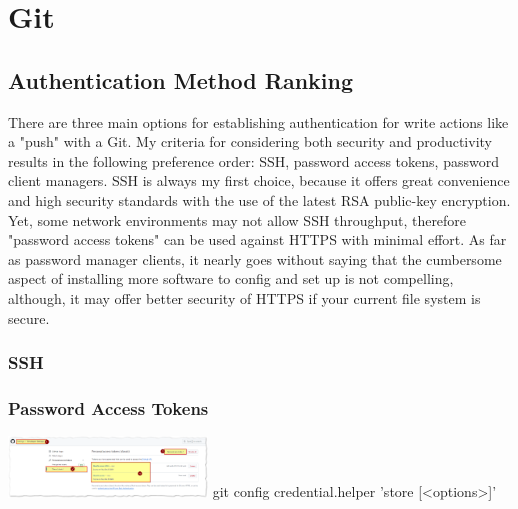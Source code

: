 \documentclass{article}
\begin{document}

\section{Git}
\subsection{Authentication Method Ranking}
There are three main options for establishing authentication for write actions like a "push" with a Git.  My criteria for considering both security and productivity results in the following preference order: SSH, password access tokens, password client managers.  SSH is always my first choice, because it offers great convenience and high security standards with the use of the latest RSA public-key encryption.  Yet, some network environments may not allow SSH throughput, therefore "password access tokens" can be used against HTTPS with minimal effort.  As far as password manager clients, it nearly goes without saying that the cumbersome aspect of installing more software to config and set up is not compelling, although, it may offer better security of HTTPS if your current file system is secure.
\subsubsection{SSH}

\subsubsection{Password Access Tokens}

\includegraphics[width=200px]{images/Personal-Access-Tokens.png}
git config credential.helper 'store [<options>]'
\end{document}
